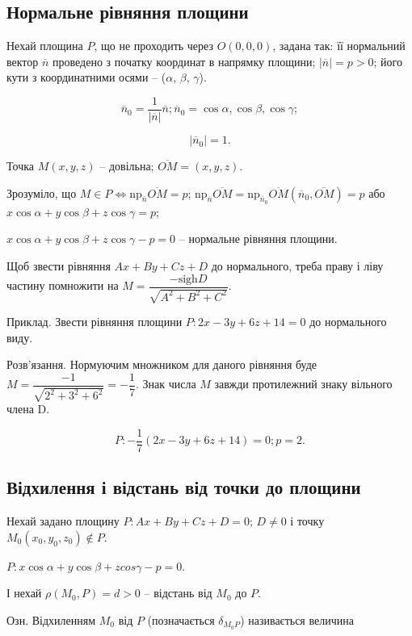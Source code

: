 \subsection{Нормальне рівняння площини}

Нехай площина $P$, що не
проходить через $O(0,0,0)$, задана так:
її нормальний вектор $\overline{n}$ проведено з
початку координат в напрямку
площини; $|\overline{n}| = p > 0$; його кути з
координатними осями -- ($\alpha$, $\beta$, $\gamma$).

$$\overline{n}_0 = \dfrac{1}{|\overline{n}|}\overline{n}; \overline{n}_0 = {\cos \alpha, \cos \beta, \cos\gamma};$$

$$|\overline{n}_0| = 1.$$

Точка $M(x,y,z)$ -- довільна; $\overline{OM} = (x, y,z)$.

Зрозуміло, що $M \in P \Leftrightarrow \text{np}_{\overline{n}}\overline{OM} = p$; $\text{np}_{\overline{n}}\overline{OM} = \text{np}_{\overline{n}_0} \overline{OM}(\overline{n}_0, \overline{OM}) = p$ або
$x \cos \alpha + y \cos \beta + z \cos \gamma = p$;

$x \cos \alpha + y \cos \beta + z \cos \gamma - p = 0$ -- нормальне рівняння площини.

Щоб звести рівняння $Ax + By + Cz + D$ до нормального, треба праву і
ліву частину помножити на $M = \dfrac{- \text{sigh} D }{\sqrt{A^2 + B^2 + C^2}}$.

Приклад. Звести рівняння площини $P: 2x - 3y + 6z + 14 = 0$ до нормального
виду.

Розв’язання. Нормуючим множником для даного рівняння буде
$M = \dfrac{- 1 }{\sqrt{2^2 + 3^2 + 6^2}} = -\dfrac{1}{7}$. Знак числа $M$ завжди протилежний знаку вільного
члена D.

$$P: -\dfrac{1}{7}(2x - 3y + 6z + 14) = 0; p = 2.$$


\subsection{Відхилення і відстань від точки до площини}

Нехай задано площину $P: Ax + By + Cz + D = 0$; $D \neq 0$ і точку
$M_0(x_0,y_0,z_0) \notin P$.

$P: x \cos \alpha + y \cos \beta + z cos \gamma - p = 0$.

І нехай $\rho(M_0,P) = d > 0$ -- відстань від $M_0$ до $P$.

Озн. Відхиленням $M_0$ від $P$ (позначається $\delta_{M_0P}$) називається величина

